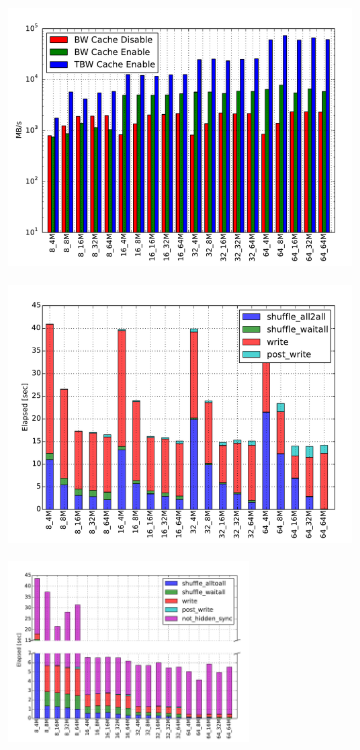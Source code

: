 \begin{figure}[]
  \centering
  \begin{subfigure}[]{0.7\textwidth}
  \centering
  \includegraphics[width=\textwidth]{figures/ior_32GB_30sec_bw}
  \caption{}
  \label{figure: ior-bw}
  \end{subfigure}
  \begin{subfigure}[]{0.7\textwidth}
  \centering
  \includegraphics[width=\textwidth]{figures/ior_32GB_30sec_disable}
  \caption{}
  \label{figure: ior-elaps-disable}
  \end{subfigure}
  \begin{subfigure}[]{\textwidth}
  \centering
  \includegraphics[width=0.7\textwidth]{figures/ior_32GB_30sec_enable}

\end{subfigure}
\end{figure}

